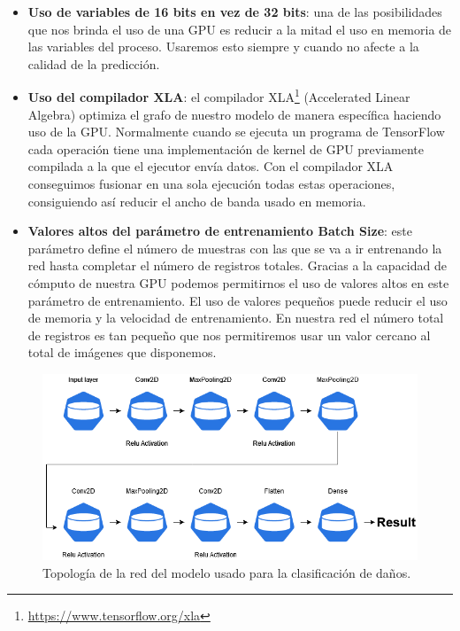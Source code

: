 \begin{itemize}
    \item \textbf{Uso de variables de 16 bits en vez de 32 bits}: una de las posibilidades que nos brinda el uso de una GPU es reducir a la mitad el uso en memoria de las variables del proceso.
    Usaremos esto siempre y cuando no afecte a la calidad de la predicción.
    \item \textbf{Uso del compilador XLA}: el compilador XLA\footnote{\url{https://www.tensorflow.org/xla}} (Accelerated Linear Algebra) optimiza el grafo de nuestro modelo de manera específica haciendo uso de la GPU.
    Normalmente cuando se ejecuta un programa de TensorFlow cada operación tiene una implementación de kernel de GPU previamente compilada a la que el ejecutor envía datos.
    Con el compilador XLA conseguimos fusionar en una sola ejecución todas estas operaciones, consiguiendo así reducir el ancho de banda usado en memoria.
    \item \textbf{Valores altos del parámetro de entrenamiento Batch Size}: este parámetro define el número de muestras con las que se va a ir entrenando la red hasta completar el número de registros totales. Gracias a la capacidad de cómputo de nuestra GPU podemos permitirnos el uso de valores altos en este parámetro de entrenamiento. El uso de valores pequeños puede reducir el uso de memoria y la velocidad de entrenamiento. En nuestra red el número total de registros es tan pequeño que nos permitiremos usar un valor cercano al total de imágenes que disponemos.
\end{itemize}

\begin{figure}[h]
    \centering
    \includegraphics[width=1\textwidth]{images/chapter2/neural_network.png}
    \caption{Topología de la red del modelo  usado para la clasificación de daños.}
    \label{fig:Topología de la red del modelo de redes neuronales.}
\end{figure}

